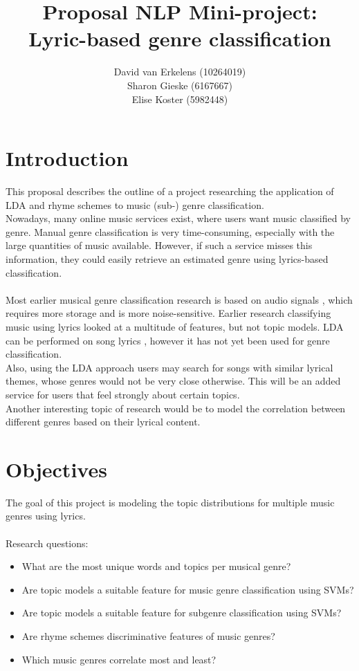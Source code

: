 \documentclass[12pt,a4paper]{amsart}
\title{Proposal NLP Mini-project:\\ Lyric-based genre classification}
\author{David van Erkelens (10264019)\\ Sharon Gieske (6167667)\\ Elise Koster (5982448)}
\date{}
\begin{document}
\maketitle

\section{Introduction}
This proposal describes the outline of a project researching the application of LDA and rhyme schemes to music (sub-) genre classification.\\
Nowadays, many online music services exist, where users want music classified by genre. Manual genre classification is very time-consuming, especially with the large quantities of music available. However, if such a service misses this information, they could easily retrieve an estimated genre using lyrics-based classification. 
\\\\
Most earlier musical genre classification research is based on audio signals \cite{audio_classification}, which requires more storage and is more noise-sensitive. Earlier research classifying music using lyrics \cite{fell lyrics} looked at a multitude of features, but not topic models. LDA can be performed on song lyrics \cite{lukiccomparison}, however it has not yet been used for genre classification. \\
Also, using the LDA approach users may search for songs with similar lyrical themes, whose genres would not be very close otherwise. This will be an added service for users that feel strongly about certain topics.\\ 
Another interesting topic of research would be to model the correlation between different genres based on their lyrical content.\\


\section{Objectives}
The goal of this project is modeling the topic distributions for multiple music genres using lyrics. \\\\
Research questions:
\begin{itemize}
\item What are the most unique words and topics per musical genre?
\item Are topic models a suitable feature for music genre classification using SVMs?
\item Are topic models a suitable feature for subgenre classification using SVMs?
\item Are rhyme schemes discriminative features of music genres?
\item Which music genres correlate most and least?
\end{itemize}
\end{document}
